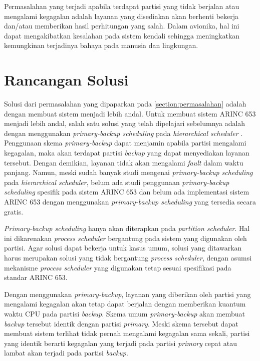 Permasalahan yang terjadi apabila terdapat partisi yang tidak berjalan atau mengalami kegagalan
adalah layanan yang disediakan akan berhenti bekerja dan/atau memberikan hasil perhitungan yang
salah. Dalam avionika, hal ini dapat mengakibatkan kesalahan pada sistem kendali sehingga
meningkatkan kemungkinan terjadinya bahaya pada manusia dan lingkungan.

\section{Rancangan Solusi}
\label{section:solution}

Solusi dari permasalahan yang dipaparkan pada \autoref{section:permasalahan} adalah dengan
membuat sistem menjadi lebih andal. Untuk membuat sistem ARINC 653 menjadi lebih andal, salah
satu solusi yang telah dipelajari sebelumnya adalah dengan menggunakan \textit{primary-backup
scheduling} pada \textit{hierarchical scheduler} \citep{Campbell1986} \citep{Bertossi2006}.
Penggunaan skema \textit{primary-backup} dapat menjamin apabila partisi mengalami kegagalan,
maka akan terdapat partisi \textit{backup} yang dapat menyediakan layanan tersebut. Dengan
demikian, layanan tidak akan mengalami \textit{fault} dalam waktu panjang.  Namun, meski sudah
banyak studi mengenai \textit{primary-backup scheduling} pada \textit{hierarchical scheduler},
belum ada studi penggunaan \textit{primary-backup scheduling} spesifik pada sistem ARINC 653 dan
belum ada implementasi sistem ARINC 653 dengan menggunakan \textit{primary-backup scheduling}
yang tersedia secara gratis.

\textit{Primary-backup scheduling} hanya akan diterapkan pada \textit{partition scheduler}. Hal
ini dikarenakan \textit{process scheduler} bergantung pada sistem yang digunakan oleh partisi.
Agar solusi dapat bekerja untuk kasus umum, solusi yang ditawarkan harus merupakan solusi yang
tidak bergantung \textit{process scheduler}, dengan asumsi mekanisme \textit{process scheduler}
yang digunakan tetap sesuai spesifikasi pada standar ARINC 653.

Dengan menggunakan \textit{primary-backup}, layanan yang diberikan oleh partisi yang mengalami
kegagalan akan tetap dapat berjalan dengan memberikan kuantum waktu CPU pada partisi \textit{backup}.
Skema umum \textit{primary-backup} akan membuat \textit{backup} tersebut identik dengan partisi
\textit{primary}. Meski skema tersebut dapat membuat sistem terlihat tidak pernah mengalami
kegagalan sama sekali, partisi yang identik berarti kegagalan yang terjadi pada partisi
\textit{primary} cepat atau lambat akan terjadi pada partisi \textit{backup}.

